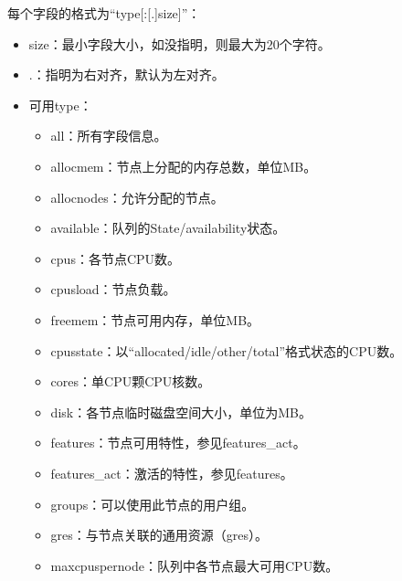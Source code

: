 \documentclass[a4paper,12pt,english]{sphinxmanual}
\begin{document}
\begin{itemize}
\sphinxAtStartPar
每个字段的格式为“type{[}:{[}.{]}size{]}”：
\begin{itemize}
\item {} 
\sphinxAtStartPar
size：最小字段大小，如没指明，则最大为20个字符。

\item {} 
\sphinxAtStartPar
.：指明为右对齐，默认为左对齐。

\item {} 
\sphinxAtStartPar
可用type：
\begin{itemize}
\item {} 
\sphinxAtStartPar
all：所有字段信息。

\item {} 
\sphinxAtStartPar
allocmem：节点上分配的内存总数，单位MB。

\item {} 
\sphinxAtStartPar
allocnodes：允许分配的节点。

\item {} 
\sphinxAtStartPar
available：队列的State/availability状态。

\item {} 
\sphinxAtStartPar
cpus：各节点CPU数。

\item {} 
\sphinxAtStartPar
cpusload：节点负载。

\item {} 
\sphinxAtStartPar
freemem：节点可用内存，单位MB。

\item {} 
\sphinxAtStartPar
cpusstate：以“allocated/idle/other/total”格式状态的CPU数。

\item {} 
\sphinxAtStartPar
cores：单CPU颗CPU核数。

\item {} 
\sphinxAtStartPar
disk：各节点临时磁盘空间大小，单位为MB。

\item {} 
\sphinxAtStartPar
features：节点可用特性，参见features\_act。

\item {} 
\sphinxAtStartPar
features\_act：激活的特性，参见features。

\item {} 
\sphinxAtStartPar
groups：可以使用此节点的用户组。

\item {} 
\sphinxAtStartPar
gres：与节点关联的通用资源（gres）。

\item {} 
\sphinxAtStartPar
maxcpuspernode：队列中各节点最大可用CPU数。


\end{itemize}
\end{itemize}
\end{itemize}
\end{document}
